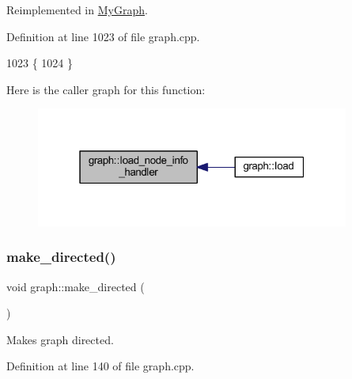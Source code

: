 Reimplemented in \mbox{\hyperlink{class_my_graph_acef355f66e5aeb19265a9860f2920381}{My\+Graph}}.



Definition at line 1023 of file graph.\+cpp.


\begin{DoxyCode}
1023                                                        \{
1024 \}
\end{DoxyCode}
Here is the caller graph for this function\+:\nopagebreak
\begin{figure}[H]
\begin{center}
\leavevmode
\includegraphics[width=292pt]{classgraph_ae956c361413410987a54e2296af2572f_icgraph}
\end{center}
\end{figure}
\mbox{\label{classgraph_a1615678dee6248d6d8a00c553770b3bd}} 
\subsubsection{\texorpdfstring{make\+\_\+directed()}{make\_directed()}}
{\footnotesize\ttfamily void graph\+::make\+\_\+directed (\begin{DoxyParamCaption}{ }\end{DoxyParamCaption})}

Makes graph directed. 

Definition at line 140 of file graph.\+cpp.


